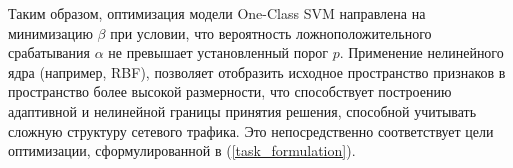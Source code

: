Таким образом, оптимизация модели One-Class SVM направлена на минимизацию $\beta$ при условии, что вероятность ложноположительного срабатывания $\alpha$ не превышает установленный порог $p$. Применение нелинейного ядра (например, RBF), позволяет отобразить исходное пространство признаков в пространство более высокой размерности, что способствует построению адаптивной и нелинейной границы принятия решения, способной учитывать сложную структуру сетевого трафика. Это непосредственно соответствует цели оптимизации, сформулированной в (\ref{task_formulation}).
